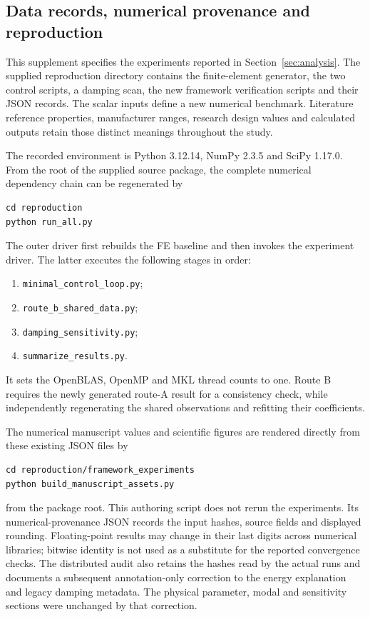\subsection{Data records, numerical provenance and reproduction}
\label{sx:records}
This supplement specifies the experiments reported in
Section~\ref{sec:analysis}. The supplied reproduction directory contains
the finite-element generator, the two control scripts, a damping scan,
the new framework verification scripts and their JSON records. The scalar inputs define a new numerical
benchmark. Literature reference properties, manufacturer ranges,
research design values and calculated outputs retain those distinct
meanings throughout the study.

The recorded environment is Python 3.12.14, NumPy
2.3.5 and SciPy 1.17.0.
From the root of the supplied source package, the complete numerical
dependency chain can be regenerated by
\begin{verbatim}
cd reproduction
python run_all.py
\end{verbatim}
The outer driver first rebuilds the FE baseline and then invokes the
experiment driver. The latter executes the following stages in order:
\begin{enumerate}
\item \texttt{minimal\_control\_loop.py};
\item \texttt{route\_b\_shared\_data.py};
\item \texttt{damping\_sensitivity.py};
\item \texttt{summarize\_results.py}.
\end{enumerate}
It sets the OpenBLAS, OpenMP and MKL
thread counts to one. Route B requires the newly generated route-A
result for a consistency check, while independently regenerating the
shared observations and refitting their coefficients.

The numerical manuscript values and scientific figures are rendered
directly from these existing JSON files by
\begin{verbatim}
cd reproduction/framework_experiments
python build_manuscript_assets.py
\end{verbatim}
from the package root. This authoring script does not rerun the
experiments. Its numerical-provenance JSON records the input hashes,
source fields and displayed rounding. Floating-point results may
change in their last digits across numerical libraries; bitwise
identity is not used as a substitute for the reported convergence
checks. The distributed audit also retains the hashes read by the
actual runs and documents a subsequent annotation-only correction
to the energy explanation and legacy damping metadata. The physical
parameter, modal and sensitivity sections were unchanged by that
correction.

